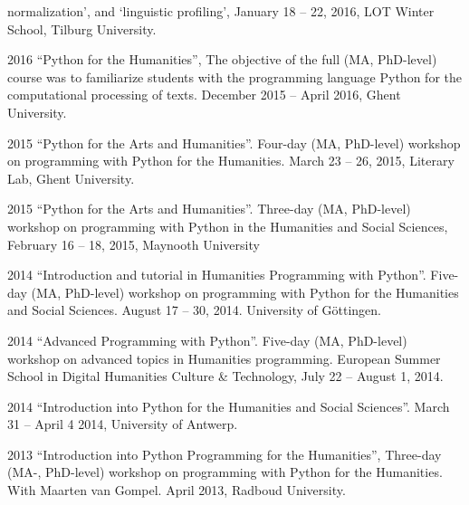\documentclass[12pt,letterpaper]{report}
\begin{document}
\begin{tablist}
    normalization', and `linguistic profiling', January 18 -- 22, 2016, LOT Winter School,
    Tilburg University.
  \item[2016] \tab{}``Python for the Humanities'', The objective of the full (MA,
    PhD-level) course was to familiarize students with the programming language Python for
    the computational processing of texts. December 2015 -- April 2016, Ghent University. 
  \item[2015] \tab{}``Python for the Arts and Humanities''. Four-day (MA, PhD-level)
    workshop on programming with Python for the Humanities. March 23 -- 26, 2015, Literary
    Lab, Ghent University.
  \item[2015] \tab{}``Python for the Arts and Humanities''. Three-day (MA, PhD-level)
    workshop on programming with Python in the Humanities and Social Sciences, February 16
    -- 18, 2015, Maynooth University
  \item[2014] \tab{}``Introduction and tutorial in Humanities Programming with Python''.
    Five-day (MA, PhD-level) workshop on programming with Python for the Humanities and
    Social Sciences. August 17 -- 30, 2014. University of Göttingen. 
  \item[2014] \tab{}``Advanced Programming with Python''. Five-day (MA, PhD-level)
    workshop on advanced topics in Humanities programming. European Summer School in
    Digital Humanities Culture \& Technology, July 22 -- August 1, 2014. 
  \item[2014] \tab{}``Introduction into Python for the Humanities and Social Sciences''.
    March 31 -- April 4 2014, University of Antwerp. 
  \item[2013] \tab{}``Introduction into Python Programming for the Humanities'', Three-day
    (MA-, PhD-level) workshop on programming with Python for the Humanities. With
    Maarten van Gompel. April 2013, Radboud University.
  \end{tablist}
\end{document}
